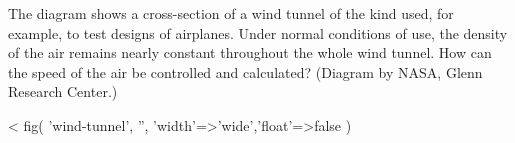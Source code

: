         The diagram shows a cross-section of a wind tunnel of the kind used, for example,
        to test designs of airplanes. Under normal conditions of use, the density of the air
        remains nearly constant throughout the whole wind tunnel. How can the speed of
        the air be controlled and calculated? (Diagram by NASA, Glenn Research Center.)

<%
  fig(
    'wind-tunnel',
    '',
    {'width'=>'wide','float'=>false}
  )

